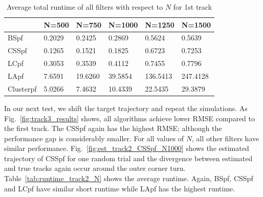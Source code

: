\documentclass[10pt,letterpaper,final]{article}
\begin{document}
\begin{table}[]
\centering
\begin{tabular}{|l|l|l|l|l|l|}
\hline
          & N=500  & N=750   & N=1000  & N=1250   & N=1500   \\ \hline
BSpf      & 0.2029 & 0.2425  & 0.2869  & 0.5624   & 0.5639   \\ \hline
CSSpf     & 0.1265 & 0.1521  & 0.1825  & 0.6723   & 0.7253   \\ \hline
LCpf      & 0.3053 & 0.3539  & 0.4112  & 0.7455   & 0.7796   \\ \hline
LApf      & 7.6591 & 19.6260 & 39.5854 & 136.5413 & 247.4128 \\ \hline
Clusterpf & 5.0266 & 7.4632  & 10.4339 & 22.5435  & 29.3879  \\ \hline
\end{tabular}
\caption{Average total runtime of all filters with respect to $N$ for 1st track}
\label{tab:runtime_track1_N}
\end{table}

In our next test, we shift the target trajectory and repeat the simulations. As Fig.~\ref{fig:track3_results} shows, all algorithms achieve lower RMSE compared to the first track. The CSSpf again has the highest RMSE; although the performance gap is considerably smaller. For all values of $N$, all other filters have similar performance. Fig.~\ref{fig:est_track2_CSSpf_N1000} shows the estimated trajectory of CSSpf for one random trial and the divergence between estimated and true tracks again occur around the outer corner turn. Table~\ref{tab:runtime_track2_N} shows the average runtime. Again, BSpf, CSSpf and LCpf have similar short runtime while LApf has the highest runtime. 
\end{document}
